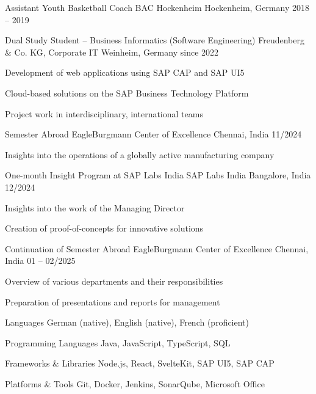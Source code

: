 \documentclass[11pt, a4paper]{awesome-cv}
\begin{document}
\begin{cventries}

\cventry
  {Assistant Youth Basketball Coach}
  {BAC Hockenheim}
  {Hockenheim, Germany}
  {2018 -- 2019}
  {}

\cventry
  {Dual Study Student – Business Informatics (Software Engineering)}
  {Freudenberg \& Co. KG, Corporate IT}
  {Weinheim, Germany}
  {since 2022}
  {
    \begin{cvitems}
      \item {Development of web applications using SAP CAP and SAP UI5}
      \item {Cloud-based solutions on the SAP Business Technology Platform}
      \item {Project work in interdisciplinary, international teams}
    \end{cvitems}
  }

\cventry
  {Semester Abroad}
  {EagleBurgmann Center of Excellence}
  {Chennai, India}
  {11/2024}
  {
    \begin{cvitems}
      \item {Insights into the operations of a globally active manufacturing company}
    \end{cvitems}
  }

\cventry
  {One-month Insight Program at SAP Labs India}
  {SAP Labs India}
  {Bangalore, India}
  {12/2024}
  {
    \begin{cvitems}
      \item {Insights into the work of the Managing Director}
      \item {Creation of proof-of-concepts for innovative solutions}
    \end{cvitems}
  }

\cventry
  {Continuation of Semester Abroad}
  {EagleBurgmann Center of Excellence}
  {Chennai, India}
  {01 -- 02/2025}
  {
    \begin{cvitems}
      \item {Overview of various departments and their responsibilities}
      \item {Preparation of presentations and reports for management}
    \end{cvitems}
  }

\end{cventries}


\begin{cvskills}

\cvskill
{Languages}
{German (native), English (native), French (proficient)}

\cvskill
{Programming Languages}
{Java, JavaScript, TypeScript, SQL}

\cvskill
{Frameworks \& Libraries}
{Node.js, React, SvelteKit, SAP UI5, SAP CAP}

\cvskill
{Platforms \& Tools}
{Git, Docker, Jenkins, SonarQube, Microsoft Office}

\end{cvskills}
\end{document}
